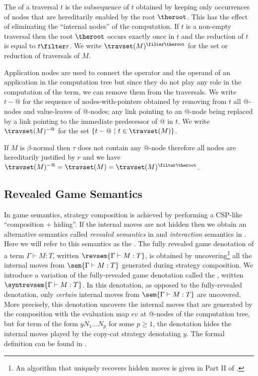 The  of a traversal $t$ is the subsequence of $t$ obtained by keeping only occurrences of nodes that are hereditarily enabled by the root $\theroot$. This has the effect of eliminating the ``internal nodes'' of the computation. If $t$ is a non-empty traversal then the root $\theroot$ occurs exactly once in $t$ and the reduction of $t$ is equal to $t \filter r$. We write $\travset(M)^{\filter \theroot}$ for the set or reduction of traversals of $M$.

Application nodes are used to connect the operator and the operand of an application in the computation tree but since they do not play any role in the computation of the term, we can remove them from the traversals.  We write $t-@$ for the sequence of nodes-with-pointers obtained by removing from $t$ all @-nodes and value-leaves of @-nodes; any link pointing to an @-node being replaced by a link pointing to the immediate predecessor of @ in $t$. We write $\travset(M)^{-@}$ for the set $\{ t - @ \ | \  t \in \travset(M) \}$.
\begin{remark}
If $M$ is $\beta$-normal then $\tau$ does not contain any @-node therefore all nodes are hereditarily justified by $r$ and we have $\travset(M)^{-@} = \travset(M) = \travset(M)^{\filter \theroot }$.
\end{remark}

\subsection{Revealed Game Semantics}

In game semantics, strategy composition is achieved by performing a CSP-like ``composition + hiding''. If the internal moves are not hidden then we obtain an alternative semantics called \emph{revealed semantics} in \cite{willgreenlandthesis} and \emph{interaction} semantics in \cite{DBLP:conf/sas/DimovskiGL05}. Here we will refer to this semantics as the . The fully revealed game denotation of a term $\Gamma \vdash M :T$, written $\revsem{\Gamma \vdash M : T}$, is obtained by uncovering\footnote{An algorithm that uniquely recovers hidden moves is given in Part II of
  \cite{hylandong_pcf}.} all the internal moves from $\sem{\Gamma \vdash
  M : T}$ generated during strategy composition.
We introduce a variation of the fully-revealed game denotation called the , written $\syntrevsem{\Gamma \vdash
  M : T}$. In this denotation, as opposed to the fully-revealed denotation,
only \emph{certain} internal moves from $\sem{\Gamma \vdash
  M : T}$ are uncovered. More precisely, this denotation uncovers
  the internal moves that are generated by the composition with the evaluation map $ev$ at @-nodes of the computation tree, but for term of the form $y N_1 \ldots N_p$ for some $p\geq1$, the denotation hides the internal moves 
  played by the copy-cat strategy denotating $y$. The formal definition can be found in \cite{localbeta2008}.

